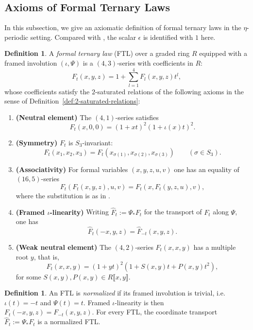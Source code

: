 \documentclass[a4paper]{amsart}
\theoremstyle{plain}
\theoremstyle{definition}
\newtheorem{definition}[subsubsection]{Definition}
\begin{document}
\subsection{Axioms of Formal Ternary Laws}\label{subsec:axiom-formal-ternary-law}
In this subsection, we give an axiomatic definition of formal ternary laws in the $\eta$-periodic setting. Compared with \cite{coulette2024formal}, the scalar $\epsilon$ is identified with $1$ here.
\begin{definition}\label{def:formal-ternary-law}
	A \emph{formal ternary law} (FTL) over a graded ring $R$ equipped with a framed involution $(\iota, \Psi)$ is a $(4,3)$-series with coefficients in $R$:
	\[
		F_t(x,y,z)= 1 + \sum_{l=1}^{4} F_l(x,y,z)t^l,
	\]
	whose coefficients satisfy the $2$-saturated relations of the following axioms in the sense of Definition~\ref{def:2-saturated-relations}:
	\begin{enumerate}
		\item \textbf{(Neutral element)} The $(4,1)$-series satisfies
		      \[
			      F_t(x,0,0)=(1+xt)^2 (1+\iota(x)t)^2.
		      \]
		\item \textbf{(Symmetry)} $F_t$ is $S_3$-invariant:
		      \[
			      F_t(x_1,x_2,x_3)=F_t(x_{\sigma(1)},x_{\sigma(2)},x_{\sigma(3)})\qquad (\sigma\in S_3).
		      \]
		\item \textbf{(Associativity)} For formal variables $(x,y,z,u,v)$ one has an equality of $(16,5)$-series
		      \[
			      F_t\left(F_t(x,y,z),u,v\right)=F_t\left(x,F_t(y,z,u),v\right),
		      \]
		      where the substitution is as in \cite[Definition~2.1.13]{coulette2024formal}.
		\item \textbf{(Framed $\iota$-linearity)} Writing $\widehat{F}_t:=\Psi_*F_t$ for the transport of $F_t$ along $\Psi$, one has
		      \[
			      \widehat{F}_t(-x,y,z)=\widehat{F}_{-t}(x,y,z).
		      \]
		\item \textbf{(Weak neutral element)} The $(4,2)$-series $F_t(x,x,y)$ has a multiple root $y$, that is,
		      \[
			      F_t(x,x,y) = (1+yt)^2(1+ S(x,y)t + P(x,y)t^2),
		      \]
		      for some $S(x,y), P(x,y) \in R\llbracket x,y \rrbracket$.
	\end{enumerate}
\end{definition}
\begin{definition}
	An FTL is \emph{normalized} if its framed involution is trivial, i.e.\ $\iota(t)=-t$ and $\Psi(t)=t$. Framed $\iota$-linearity is then $F_t(-x,y,z)=F_{-t}(x,y,z)$. For every FTL, the coordinate transport $\widehat F_t:=\Psi_*F_t$ is a normalized FTL.
\end{definition}
\end{document}

